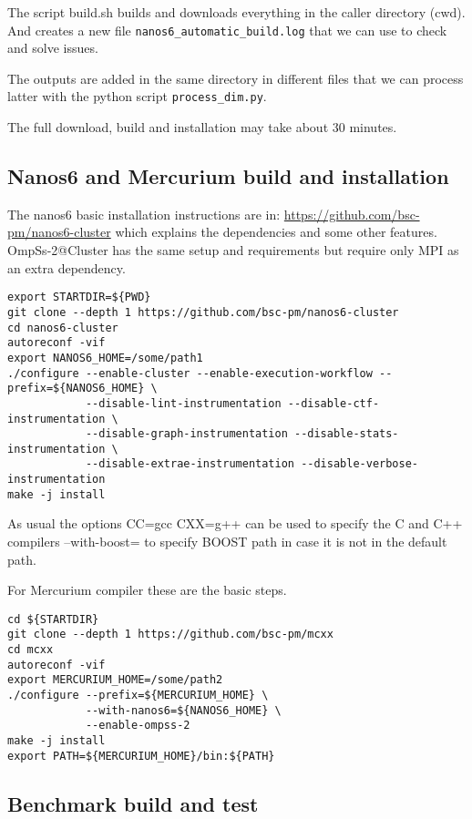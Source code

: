 \documentclass{article}
\newcommand{\code}[1]{\texttt{#1}}
\begin{document}
The script build.sh builds and downloads everything in the caller
directory (cwd). And creates a new file
\code{nanos6\_automatic\_build.log} that we can use to check and solve
issues.

The outputs are added in the same directory in different files that we
can process latter with the python script \code{process\_dim.py}.

The full download, build and installation may take about 30 minutes. 

\subsection{Nanos6 and Mercurium build and installation}

The nanos6 basic installation instructions are in:
\url{https://github.com/bsc-pm/nanos6-cluster} which explains the
dependencies and some other features.  OmpSs-2@Cluster has the same
setup and requirements but require only MPI as an extra dependency.

\begin{lstlisting}
export STARTDIR=${PWD}
git clone --depth 1 https://github.com/bsc-pm/nanos6-cluster
cd nanos6-cluster
autoreconf -vif
export NANOS6_HOME=/some/path1
./configure --enable-cluster --enable-execution-workflow --prefix=${NANOS6_HOME} \
            --disable-lint-instrumentation --disable-ctf-instrumentation \
            --disable-graph-instrumentation --disable-stats-instrumentation \
            --disable-extrae-instrumentation --disable-verbose-instrumentation
make -j install
\end{lstlisting}

As usual the options CC=gcc CXX=g++ can be used to specify the C and
C++ compilers --with-boost= to specify BOOST path in case it is not in
the default path.

For Mercurium compiler these are the basic steps.

\begin{lstlisting}
cd ${STARTDIR}
git clone --depth 1 https://github.com/bsc-pm/mcxx
cd mcxx
autoreconf -vif
export MERCURIUM_HOME=/some/path2
./configure --prefix=${MERCURIUM_HOME} \
            --with-nanos6=${NANOS6_HOME} \
            --enable-ompss-2
make -j install
export PATH=${MERCURIUM_HOME}/bin:${PATH}
\end{lstlisting}

\subsection{Benchmark build and test}
\end{document}
